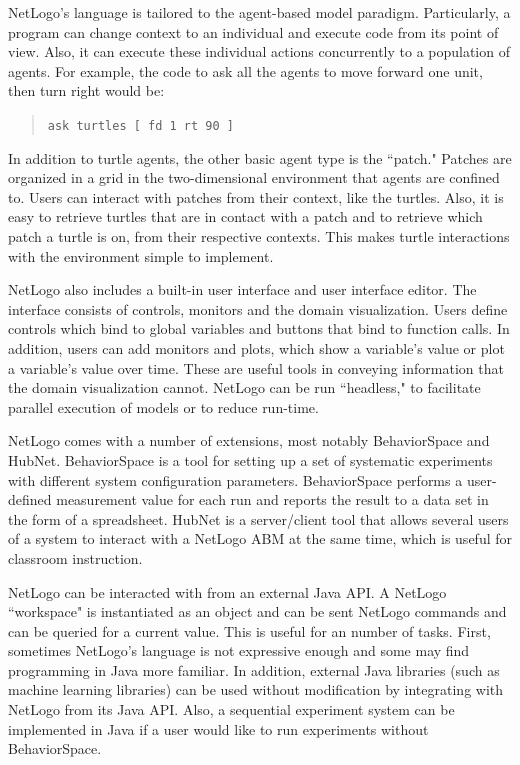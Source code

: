 NetLogo's language is tailored to the agent-based model paradigm.
Particularly, a program can change context to an individual and execute code from its point of view.
Also, it can execute these individual actions concurrently to a population of agents.
For example, the code to ask all the agents to move forward one unit, then turn right would be:
\begin{quote}\texttt{\small ask turtles [ fd 1 rt 90 ]}\end{quote}
In addition to turtle agents, the other basic agent type is the ``patch."
Patches are organized in a grid in the two-dimensional environment that agents are confined to.
Users can interact with patches from their context, like the turtles.
Also, it is easy to retrieve turtles that are in contact with a patch and to retrieve which patch a turtle is on, from their respective contexts.
This makes turtle interactions with the environment simple to implement.

NetLogo also includes a built-in user interface and user interface editor.
The interface consists of controls, monitors and the domain visualization.
Users define controls which bind to global variables and buttons that bind to function calls.
In addition, users can add monitors and plots, which show a variable's value or plot a variable's value over time.
These are useful tools in conveying information that the domain visualization cannot.
NetLogo can be run ``headless," to facilitate parallel execution of models or to reduce run-time.

NetLogo comes with a number of extensions, most notably BehaviorSpace and HubNet.
BehaviorSpace is a tool for setting up a set of systematic experiments with different system configuration parameters.
BehaviorSpace performs a user-defined measurement value for each run and reports the result to a data set in the form of a spreadsheet.
HubNet is a server/client tool that allows several users of a system to interact with a NetLogo ABM at the same time, which is useful for classroom instruction.

NetLogo can be interacted with from an external Java API.
A NetLogo ``workspace" is instantiated as an object and can be sent NetLogo commands and can be queried for a current value.
This is useful for an number of tasks.
First, sometimes NetLogo's language is not expressive enough and some may find programming in Java more familiar.
In addition, external Java libraries (such as machine learning libraries) can be used without modification by integrating with NetLogo from its Java API.
Also, a sequential experiment system can be implemented in Java if a user would like to run experiments without BehaviorSpace.

